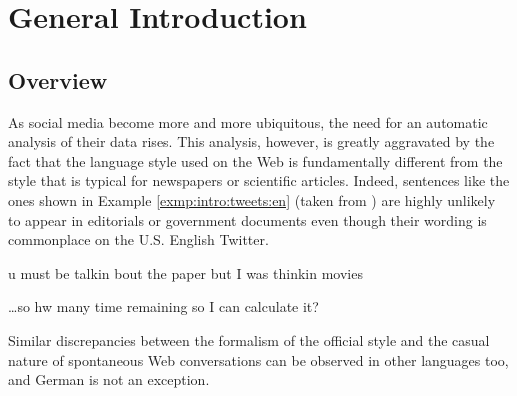 

\chapter{General Introduction}

\section{Overview}
As social media become more and more ubiquitous, the need for an
automatic analysis of their data rises.  This analysis, however, is
greatly aggravated by the fact that the language style used on the Web
is fundamentally different from the style that is typical for
newspapers or scientific articles.  Indeed, sentences like the ones
shown in Example \ref{exmp:intro:tweets:en} (taken from
\citet{HanBaldwin:11}) are highly unlikely to appear in editorials or
government documents even though their wording is commonplace on the
U.S. English Twitter.
\begin{example}\label{exmp:intro:tweets:en}
u must be talkin bout the paper but I was thinkin movies

\dots so hw many time remaining so I can calculate it?
\end{example}
Similar discrepancies between the formalism of the official style and the
casual nature of spontaneous Web conversations can be observed in other
languages too, and German is not an exception.

